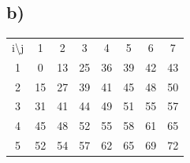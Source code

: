 \documentclass[11pt]{article} %
\begin{document}
\subsection*{b)}
\begin{table}[h]
\centering
\begin{tabular}{cccccccc}
i\textbackslash{}j     & 1                                               & 2                                               & 3                                               & 4                                               & 5                                               & 6                                               & 7                                               \\ \cline{2-8}
\multicolumn{1}{c|}{1} & \multicolumn{1}{c|}{\cellcolor[HTML]{FFFFFF}0}  & \multicolumn{1}{c|}{\cellcolor[HTML]{FFFFFF}13} & \multicolumn{1}{c|}{\cellcolor[HTML]{FFFFFF}25} & \multicolumn{1}{c|}{\cellcolor[HTML]{F8FF00}36} & \multicolumn{1}{c|}{\cellcolor[HTML]{F8FF00}39} & \multicolumn{1}{c|}{\cellcolor[HTML]{F8FF00}42} & \multicolumn{1}{c|}{\cellcolor[HTML]{F8FF00}43} \\ \cline{2-8}
\multicolumn{1}{c|}{2} & \multicolumn{1}{c|}{\cellcolor[HTML]{FFFFFF}15} & \multicolumn{1}{c|}{\cellcolor[HTML]{FFFFFF}27} & \multicolumn{1}{c|}{\cellcolor[HTML]{F8FF00}39} & \multicolumn{1}{c|}{\cellcolor[HTML]{F8FF00}41} & \multicolumn{1}{c|}{\cellcolor[HTML]{F8FF00}45} & \multicolumn{1}{c|}{\cellcolor[HTML]{F8FF00}48} & \multicolumn{1}{c|}{\cellcolor[HTML]{F8FF00}50} \\ \cline{2-8}
\multicolumn{1}{c|}{3} & \multicolumn{1}{c|}{\cellcolor[HTML]{FFFFFF}31} & \multicolumn{1}{c|}{\cellcolor[HTML]{F8FF00}41} & \multicolumn{1}{c|}{\cellcolor[HTML]{F8FF00}44} & \multicolumn{1}{c|}{\cellcolor[HTML]{F8FF00}49} & \multicolumn{1}{c|}{\cellcolor[HTML]{F8FF00}51} & \multicolumn{1}{c|}{\cellcolor[HTML]{F8FF00}55} & \multicolumn{1}{c|}{\cellcolor[HTML]{F8FF00}57} \\ \cline{2-8}
\multicolumn{1}{c|}{4} & \multicolumn{1}{c|}{\cellcolor[HTML]{F8FF00}45} & \multicolumn{1}{c|}{\cellcolor[HTML]{F8FF00}48} & \multicolumn{1}{c|}{\cellcolor[HTML]{F8FF00}52} & \multicolumn{1}{c|}{\cellcolor[HTML]{F8FF00}55} & \multicolumn{1}{c|}{\cellcolor[HTML]{F8FF00}58} & \multicolumn{1}{c|}{\cellcolor[HTML]{F8FF00}61} & \multicolumn{1}{c|}{\cellcolor[HTML]{F8FF00}65} \\ \cline{2-8}
\multicolumn{1}{c|}{5} & \multicolumn{1}{c|}{\cellcolor[HTML]{F8FF00}52} & \multicolumn{1}{c|}{\cellcolor[HTML]{F8FF00}54} & \multicolumn{1}{c|}{\cellcolor[HTML]{F8FF00}57} & \multicolumn{1}{c|}{\cellcolor[HTML]{F8FF00}62} & \multicolumn{1}{c|}{\cellcolor[HTML]{F8FF00}65} & \multicolumn{1}{c|}{\cellcolor[HTML]{F8FF00}69} & \multicolumn{1}{c|}{\cellcolor[HTML]{F8FF00}72} \\ \cline{2-8}

\end{tabular}
\end{table}
\end{document}
